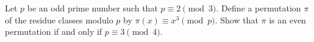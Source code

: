 Let $p$ be an odd prime number such that $p \equiv 2 \pmod{3}$. Define a permutation $\pi$ of the
residue classes modulo $p$ by $\pi(x) \equiv x^3 \pmod{p}$. Show that $\pi$ is an even permutation
if and only if $p \equiv 3 \pmod{4}$.

